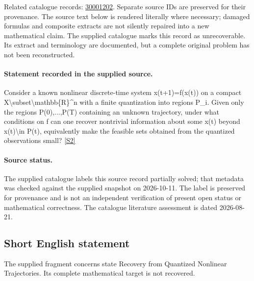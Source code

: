 \documentclass[11pt]{article}
\begin{document}
Related catalogue records: \href{https://mehmetmars7.github.io/Erdosproblems-llm-hunter/problem.html?type=open_problems&id=30001202}{30001202}. Separate source IDs are preserved for their provenance.
The source text below is rendered literally where necessary; damaged formulas and composite extracts are not silently repaired into a new mathematical claim.
The supplied catalogue marks this record as unrecoverable. Its extract and terminology are documented, but a complete original problem has not been reconstructed.
\paragraph{Statement recorded in the supplied source.}
Consider a known nonlinear discrete-time system x(t+1)=f(x(t)) on a compact X\textbackslash{}subset\textbackslash{}mathbb\{R\}\textasciicircum{}n with a finite quantization into regions P\_i. Given only the regions P(0),...,P(T) containing an unknown trajectory, under what conditions on f can one recover nontrivial information about some x(t) beyond x(t)\textbackslash{}in P(t), equivalently make the feasible sets obtained from the quantized observations small? \href{https://doi.org/10.4171/owr/2009/11}{[S2]}
\paragraph{Source status.}
The supplied catalogue labels this source record partially solved; that metadata was checked against the supplied snapshot on 2026-10-11. The label is preserved for provenance and is not an independent verification of present open status or mathematical correctness. The catalogue literature assessment is dated 2026-08-21.
\subsection{Short English statement}
The supplied fragment concerns state Recovery from Quantized Nonlinear Trajectories. Its complete mathematical target is not recovered.
\end{document}
